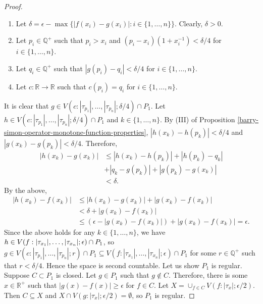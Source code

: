 \documentclass[12pt,a4paper]{amsart}
\theoremstyle{definition}
\newcommand{\myabs}[1]{ | #1 | }
\begin{document}
\begin{proof}
		\begin{enumerate}[label=\textnormal{(\Roman*)}]
			\item Let $\delta = \epsilon - \max \lbrace \myabs{f(x_i)-g(x_i)}: i \in  \lbrace 1, \ldots, n \rbrace \rbrace$. Clearly, $\delta > 0$.
			\item Let $p_i \in \mathbb{Q}^{+}$ such that $p_i > x_i$ and $(p_i-x_i)(1+x_i^{-1}) < \delta/4 $ for $ i \in \lbrace 1, \ldots, n \rbrace$.
			\item Let $q_i \in \mathbb{Q}^{+}$ such that $\myabs{g(p_i) - q_i} < \delta/4$ for $ i \in \lbrace 1, \ldots, n \rbrace$.
			\item Let $c : \mathbb{R} \rightarrow \mathbb{R}$ such that $c(p_i) = q_i$ for $ i \in \lbrace 1, \ldots, n \rbrace$.
		\end{enumerate}
		\par
		It is clear that   $ g \in V(c:\myabs{\tau_{p_1}}, \ldots, \myabs{\tau_{p_n}};  \delta /4) \cap P_1$. Let $h \in V(c: \myabs{\tau_{p_1}}, \ldots, \myabs{\tau_{p_n}};  \delta /4) \cap P_1$ and $k \in \lbrace 1, \ldots, n \rbrace$. By (III) of Proposition \ref{barry-simon-operator-monotone-function-properties}, $\myabs{h(x_k) - h(p_k)} < \delta/4$ and $\myabs{g(x_k) - g(p_k)} < \delta /4$. Therefore, 
		\begin{align*}
			\myabs{h(x_k)-g(x_k)} &\leq \myabs{h(x_k)-h(p_k)} + \myabs{h(p_k)-q_k} \\ &+\myabs{q_k - g(p_k)} + \myabs{g(p_k)-g(x_k)}   \\
			&< \delta.
		\end{align*}	   	
		By the above, 
		\begin{equation*}
			\begin{split}
				\myabs{h(x_k)  - f(x_k)} &\leq \myabs{h(x_k) - g(x_k)} + \myabs{g(x_k) - f(x_k)}   \\
				&<  \delta + \myabs{g(x_k) - f(x_k)} \\
				&\leq (\epsilon - \myabs{g(x_k) - f(x_k)}) + \myabs{g(x_k) - f(x_k)}  = \epsilon.
			\end{split}
		\end{equation*}
		Since the above holds for any $k \in \lbrace 1, \ldots, n \rbrace$, we have $h \in V(f: \myabs{\tau_{x_1}}, \ldots, \myabs{\tau_{x_n}} \\;  \epsilon) \cap P_1$, so $g \in V(c: \myabs{\tau_{p_1}}, \ldots, \myabs{\tau_{p_n}}; r) \cap P_1 \subseteq V(f: \myabs{\tau_{x_1}}, \ldots, \myabs{\tau_{x_n}};  \epsilon) \cap P_1$ for some $r \in \mathbb{Q}^{+}$ such that $r < \delta/4$. Hence the space is second countable. Let us show $P_1$ is regular. Suppose $C \subset P_1$ is closed. Let $g \in P_1$ such that $g \notin C$. Therefore, there is some $x \in \mathbb{R}^{+}$ such that $\myabs{g(x)-f(x)} \geq \epsilon$ for $f \in C$. Let $X =  \cup_{f \in C} V(f : \myabs{\tau_{x}}; \epsilon/2)$. Then $C \subseteq X$ and $X \cap V(g: \myabs{\tau_x}; \epsilon/2) = \emptyset$, so $P_1$ is regular.
	\end{proof}
	
\end{document}
